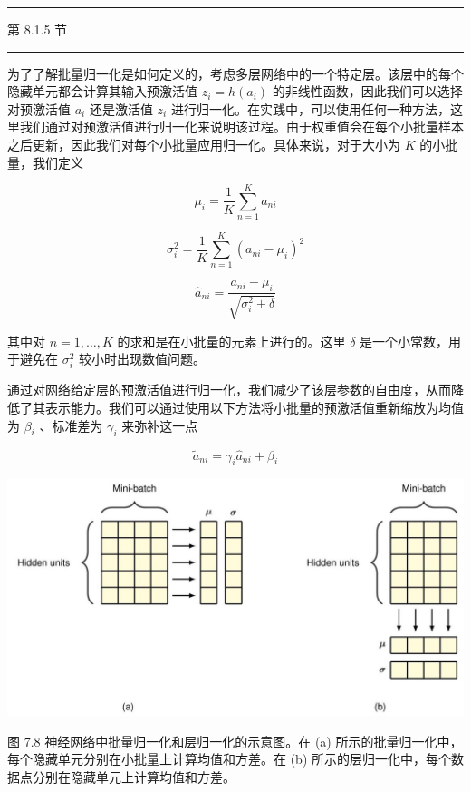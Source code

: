 \documentclass[10pt]{report}
\newcommand{\HRule}{\begin{center}\rule{0.9\linewidth}{0.2mm}\end{center}}
\begin{document}
\HRule

第 8.1.5 节

\HRule

为了了解批量归一化是如何定义的，考虑多层网络中的一个特定层。该层中的每个隐藏单元都会计算其输入预激活值 \({z}_{i} = h\left( {a}_{i}\right)\) 的非线性函数，因此我们可以选择对预激活值 \({a}_{i}\) 还是激活值 \({z}_{i}\) 进行归一化。在实践中，可以使用任何一种方法，这里我们通过对预激活值进行归一化来说明该过程。由于权重值会在每个小批量样本之后更新，因此我们对每个小批量应用归一化。具体来说，对于大小为 \(K\) 的小批量，我们定义

\[
{\mu }_{i} = \frac{1}{K}\mathop{\sum }\limits_{{n = 1}}^{K}{a}_{ni} \tag{7.52}
\]

\[
{\sigma }_{i}^{2} = \frac{1}{K}\mathop{\sum }\limits_{{n = 1}}^{K}{\left( {a}_{ni} - {\mu }_{i}\right) }^{2} \tag{7.53}
\]

\[
{\widehat{a}}_{ni} = \frac{{a}_{ni} - {\mu }_{i}}{\sqrt{{\sigma }_{i}^{2} + \delta }} \tag{7.54}
\]

其中对 \(n = 1,\ldots ,K\) 的求和是在小批量的元素上进行的。这里 \(\delta\) 是一个小常数，用于避免在 \({\sigma }_{i}^{2}\) 较小时出现数值问题。

通过对网络给定层的预激活值进行归一化，我们减少了该层参数的自由度，从而降低了其表示能力。我们可以通过使用以下方法将小批量的预激活值重新缩放为均值为 \({\beta }_{i}\) 、标准差为 \({\gamma }_{i}\) 来弥补这一点

\[
{\widetilde{a}}_{ni} = {\gamma }_{i}{\widehat{a}}_{ni} + {\beta }_{i} \tag{7.55}
\]

\begin{center}
\includegraphics[max width=1.0\textwidth]{images/0194e279-9b28-703a-88f4-c3ac21e2010d_247_237_349_1314_683_0.jpg}
\end{center}
\hspace*{3em} 

图 7.8 神经网络中批量归一化和层归一化的示意图。在 (a) 所示的批量归一化中，每个隐藏单元分别在小批量上计算均值和方差。在 (b) 所示的层归一化中，每个数据点分别在隐藏单元上计算均值和方差。
\end{document}
